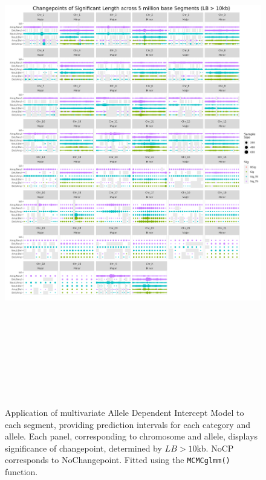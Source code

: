 \begin{figure}[!hp]
\centering
\includegraphics[width = 1\textwidth, height = 22cm]{../figures/Chapter_6/PerSegments_MCMC_10kb_fivemillion_Thesis.png}
\caption[Application of multivariate Allele Dependent Intercept Model to each segment, providing prediction intervals for each category and allele. Significance determined by $LB > 10$kb.]{Application of multivariate Allele Dependent Intercept Model to each segment, providing prediction intervals for each category and allele. Each panel, corresponding to chromosome and allele, displays significance of changepoint, determined by $LB > 10$kb. NoCP corresponds to NoChangepoint. Fitted using the \texttt{MCMCglmm()} function.}
\label{fig:PerSegment_MCMC}
\end{figure}
